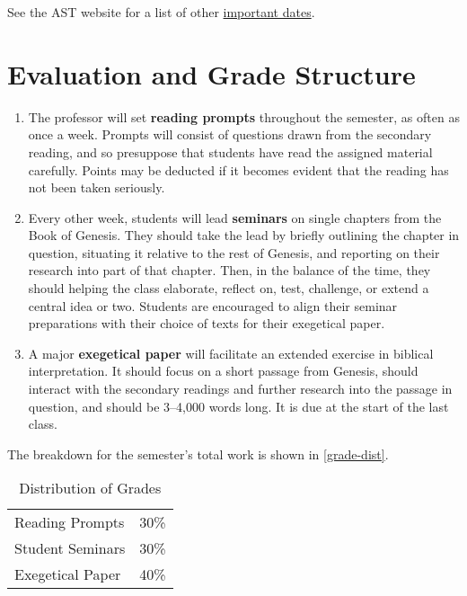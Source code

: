 \documentclass[titlepage]{article}
\newcommand\policy{../policy}
\begin{document}
See the AST website for a list of other \href{http://www.astheology.ns.ca/students/academic-dates.html}{important dates}.

\section{Evaluation and Grade Structure}
\label{evaluation}

\begin{enumerate}

	\item The professor will set \textbf{reading prompts} throughout the
	semester, as often as once a week. Prompts will consist of questions
	drawn from the secondary reading, and so presuppose that students
	have read the assigned material carefully. Points may be deducted if
	it becomes evident that the reading has not been taken seriously.

	\item Every other week, students will lead \textbf{seminars} on
	single chapters from the Book of Genesis. They should take the lead
	by briefly outlining the chapter in question, situating it relative
	to the rest of Genesis, and reporting on their research into part of
	that chapter. Then, in the balance of the time, they should helping
	the class elaborate, reflect on, test, challenge, or extend a
	central idea or two. Students are encouraged to align their seminar
	preparations with their choice of texts for their exegetical paper.

	\item A major \textbf{exegetical paper} will facilitate an extended
	exercise in biblical interpretation. It should focus on a short
	passage from Genesis, should interact with the secondary readings
	and further research into the passage in question, and should be
	3--4,000 words long. It is due at the start of the last class.

%
%
%

\end{enumerate}

The breakdown for the semester's total work is shown in
\autoref{grade-dist}.

\begin{table}[htbp]
  \centering
  {\lining
  \begin{tabular}{lr}
    \toprule
    Reading Prompts  & 30\% \\
    Student Seminars & 30\% \\
    Exegetical Paper & 40\% \\
    \bottomrule
  \end{tabular}}
  \caption{Distribution of Grades}
  \label{grade-dist}
\end{table}



\end{document}
